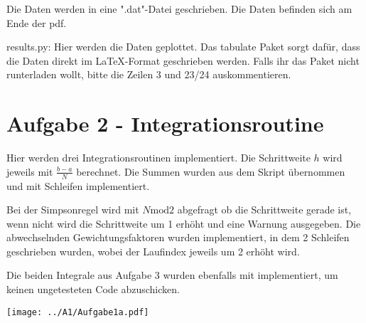 Die Daten werden in eine ".dat"-Datei geschrieben.
Die Daten befinden sich am Ende der pdf.

results.py:
Hier werden die Daten geplottet.
Das tabulate Paket sorgt dafür, dass die Daten direkt im LaTeX-Format geschrieben werden.
Falls ihr das Paket nicht runterladen wollt, bitte die Zeilen 3 und 23/24 auskommentieren.


\section{Aufgabe 2 - Integrationsroutine}
Hier werden drei Integrationsroutinen implementiert.
Die Schrittweite $h$ wird jeweils mit $\frac{b-a}{N}$ berechnet.
Die Summen wurden aus dem Skript übernommen und mit Schleifen implementiert.

Bei der Simpsonregel wird mit $N \mathup{mod} 2$ abgefragt ob die Schrittweite gerade ist, wenn nicht wird die Schrittweite um 1 erhöht und eine Warnung ausgegeben.
Die abwechselnden Gewichtungsfaktoren wurden implementiert, in dem 2 Schleifen geschrieben wurden, wobei der Laufindex jeweils um 2 erhöht wird.

Die beiden Integrale aus Aufgabe 3 wurden ebenfalls mit implementiert, um keinen ungetesteten Code abzuschicken.
\begin{landscape}
\thispagestyle{empty}
\hspace{-5cm}
\texttt{[image: ../A1/Aufgabe1a.pdf]}
\end{landscape}

